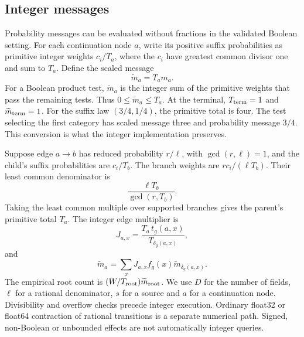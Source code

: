\subsection{Integer messages}
\label{app:dm-integer}
Probability messages can be evaluated without fractions in the validated Boolean setting.
For each continuation node \(a\), write its positive suffix probabilities as primitive integer weights \(c_i/T_a\), where the \(c_i\) have greatest common divisor one and sum to \(T_a\).
Define the scaled message
\begin{equation}
 \widetilde m_a=T_a m_a .
\end{equation}
For a Boolean product test, \(\widetilde m_a\) is the integer sum of the primitive weights that pass the remaining tests.
Thus \(0\leq\widetilde m_a\leq T_a\).
At the terminal, \(T_{\rm term}=1\) and \(\widetilde m_{\rm term}=1\).
For the suffix law \((3/4,1/4)\), the primitive total is four.
The test selecting the first category has scaled message three and probability message \(3/4\).
This conversion is what the integer implementation preserves.

Suppose edge \(a\to b\) has reduced probability \(r/\ell\), with \(\gcd(r,\ell)=1\), and the child's suffix probabilities are \(c_i/T_b\).
The branch weights are \(rc_i/(\ell T_b)\).
Their least common denominator is
\begin{equation}
 \frac{\ell T_b}{\gcd(r,T_b)}.
 \label{eq:dm-branchdenom}
\end{equation}
Taking the least common multiple over supported branches gives the parent's primitive total \(T_a\).
The integer edge multiplier is
\begin{equation}
 J_{a,x}=\frac{T_a\,t_g(a,x)}{T_{\delta_g(a,x)}} ,
\end{equation}
and
\begin{equation}
 \widetilde m_a=\sum_xJ_{a,x}f_g(x)\widetilde m_{\delta_g(a,x)} .
 \label{eq:dm-integer}
\end{equation}
The empirical root count is \((W/T_{\rm root})\widetilde m_{\rm root}\).
We use \(D\) for the number of fields, \(\ell\) for a rational denominator, \(s\) for a source and \(a\) for a continuation node.
Divisibility and overflow checks precede integer execution.
Ordinary float32 or float64 contraction of rational transitions is a separate numerical path.
Signed, non-Boolean or unbounded effects are not automatically integer queries.


